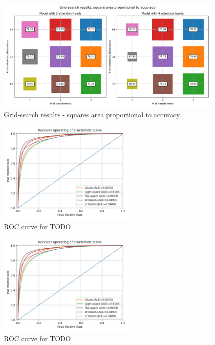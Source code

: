 \begin{figure}[hpt!]
  \centering
  \includegraphics[trim={0cm 0cm 0cm 1cm}, clip, width=1.0\textwidth, center]{../logs/grid_search.png}
  \caption{Grid-search results - squares area proportional to accuracy.}
  \label{fig:grid-search}
\end{figure}

\indo{|}

\begin{figure}[hpt!]
  \centering
  \includegraphics[trim={0cm 0cm 0cm 0cm}, width=0.6\textwidth, center]{../logs/ROC.png}
  \caption{ROC curve for TODO}
  \label{fig:ROC2}
\end{figure}

\indo{|}
\indo{|}
\indo{|}
\indo{|}
\indo{|}

\indo{|}

\begin{figure}[hpt!]
  \centering
  \includegraphics[trim={0cm 0cm 0cm 0cm}, width=0.6\textwidth, center]{../logs/ROC.png}
  \caption{ROC curve for TODO}
  \label{fig:ROC3}
\end{figure}


